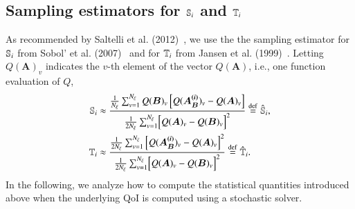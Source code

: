 \subsection{Sampling estimators for \texorpdfstring{$\S{i}$}{Si} and \texorpdfstring{$\T{i}$}{Ti}} \label{subsec:saltelli-est}
As recommended by Saltelli et al. (2012)~\cite{saltelli-etal-2012}, we use the 
the sampling estimator for $\S{i}$ from Sobol' et al. (2007)~\cite{sobol-etal-2007} and for $\T{i}$ from Jansen et al. (1999)~\cite{jansen-1999}. 
Letting $Q(\bm{A})_v$ indicates the $v$-th element of the vector $Q(\bm{A})$, i.e., one function evaluation of $Q$, 
\begin{align} \label{m2eq:saltelli-si}
    \S{i} &\approx \frac{\frac{1}{\Nxi} \sumv Q(\bm{B})_v \left[ Q(\bm{A_B^{(i)}})_v - Q(\bm{A})_v \right]}{\frac{1}{2\Nxi} \sumv \Bigl[ Q(\bm{A})_v - Q(\bm{B})_v \Bigr]^2} \defin \Ssalt{i}, \\ \label{m2eq:saltelli-ti}
    \T{i} &\approx \frac{ \frac{1}{2\Nxi} \sumv \left[ Q(\bm{A_B^{(i)}})_v - Q(\bm{A})_v \right]^2}{\frac{1}{2\Nxi} \sumv \Bigl[ Q(\bm{A})_v - Q(\bm{B})_v \Bigr]^2} \defin \Tsalt{i} .
\end{align}
In the following, we analyze how to compute the statistical quantities introduced above when the underlying QoI is computed using a stochastic solver.